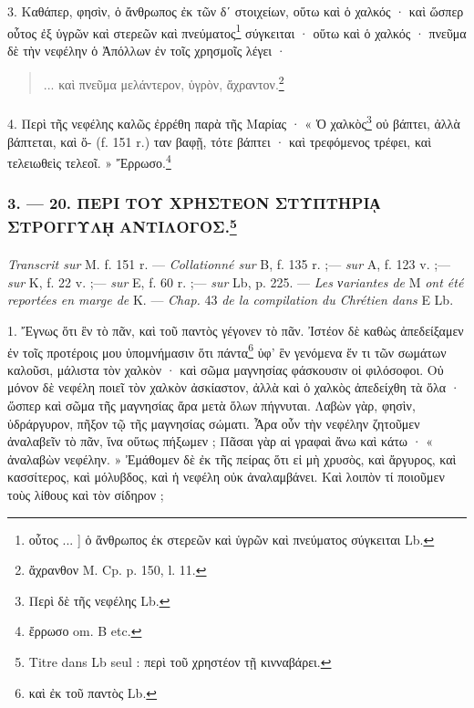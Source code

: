 \documentclass[landscape, a4paper, 11pt, oneside, polutonikogreek, french]{article}
\begin{document}
3. Καθάπερ, φησὶν, ὁ ἄνθρωπος ἐκ τῶν δʹ στοιχείων, οὕτω καὶ ὁ χαλκός · καὶ ὥσπερ οὗτος ἐξ ὑγρῶν καὶ στερεῶν καὶ πνεύματος\footnote{οὗτος ... ] ὁ ἄνθρωπος ἐκ στερεῶν καὶ ὑγρῶν καὶ πνεύματος σύγκειται Lb.} σύγκειται · οὕτω καὶ ὁ χαλκός · πνεῦμα δὲ τὴν νεφέλην ὁ Ἀπόλλων ἐν τοῖς χρησμοῖς λέγει ·
\begin{quotation}
... καὶ πνεῦμα μελάντερον, ὑγρὸν, ἄχραντον.\footnote{ἄχρανθον M. Cp. p. 150, l. 11.}
\end{quotation}
\paragraph{}
4. Περὶ τῆς νεφέλης καλῶς ἐρρέθη παρὰ τῆς Μαρίας · « Ὁ χαλκὸς\footnote{Περὶ δὲ τῆς νεφέλης Lb.} οὐ βάπτει, ἀλλὰ βάπτεται, καὶ ὅ- (f. 151 r.) ταν βαφῇ, τότε βάπτει · καὶ τρεφόμενος τρέφει, καὶ τελειωθεὶς τελεοῖ. » Ἔρρωσο.\footnote{ἔρρωσο om. B etc.}

\bigskip
\centerline{\EightStarTaper}
\centerline{\EightStarTaper\EightStarTaper}
\bigskip

\subsubsection[3. --- 20. ΠΕΡΙ ΤΟΥ ΧΡΗΣΤΕΟΝ ΣΤΥΠΤΗΡΙᾼ ΣΤΡΟΓΓΥΛῌ ΑΝΤΙΛΟΓΟΣ.]{3. --- 20. ΠΕΡΙ ΤΟΥ ΧΡΗΣΤΕΟΝ ΣΤΥΠΤΗΡΙᾼ ΣΤΡΟΓΓΥΛῌ ΑΝΤΙΛΟΓΟΣ.\footnote{Titre dans Lb seul : περὶ τοῦ χρηστέον τῇ κινναβάρει.}}
\paragraph{}
\emph{Transcrit sur} M. f. 151 r. --- \emph{Collationné sur} B, f. 135 r. ;--- \emph{sur} A, f. 123 v. ;--- \emph{sur} K, f. 22 v. ;--- \emph{sur} E, f. 60 r. ;--- \emph{sur} Lb, p. 225. --- \emph{Les νariantes de} M \emph{ont été reportées en marge de} K. --- \emph{Chap.} 43 \emph{de la compilation du Chrétien dans} E Lb.

\bigskip

1. Ἔγνως ὅτι ἓν τὸ πᾶν, καὶ τοῦ παντὸς γέγονεν τὸ πᾶν. Ἰστέον δὲ καθὼς ἀπεδείξαμεν ἐν τοῖς προτέροις μου ὑπομνήμασιν ὅτι πάντα\footnote{καὶ ἐκ τοῦ παντὸς Lb.} ὑφ' ἓν γενόμενα ἕν τι τῶν σωμάτων καλοῦσι, μάλιστα τὸν χαλκὸν · καὶ σῶμα μαγνησίας φάσκουσιν οἱ φιλόσοφοι. Οὐ μόνον δὲ νεφέλη ποιεῖ τὸν χαλκὸν ἀσκίαστον, ἀλλὰ καὶ ὁ χαλκὸς ἀπεδείχθη τὰ ὅλα · ὥσπερ καὶ σῶμα τῆς μαγνησίας ἄρα μετὰ ὅλων πήγνυται. Λαβὼν γὰρ, φησὶν, ὑδράργυρον, πῆξον τῷ τῆς μαγνησίας σώματι. Ἆρα οὖν τὴν νεφέλην ζητοῦμεν ἀναλαβεῖν τὸ πᾶν, ἵνα οὕτως πήξωμεν ; Πᾶσαι γὰρ αἱ γραφαὶ ἄνω καὶ κάτω · « ἀναλαβὼν νεφέλην. » Ἐμάθομεν δὲ ἐκ τῆς πείρας ὅτι εἰ μὴ χρυσὸς, καὶ ἄργυρος, καὶ κασσίτερος, καὶ μόλυβδος, καὶ ἡ νεφέλη οὐκ ἀναλαμβάνει. Καὶ λοιπὸν τί ποιοῦμεν τοὺς λίθους καὶ τὸν σίδηρον ;
\end{document}
